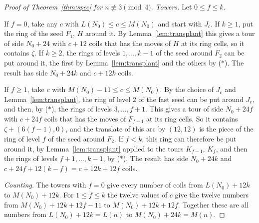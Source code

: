 \documentclass[11pt]{amsart}
\theoremstyle{remark}
\begin{document}
\begin{proof}[Proof of Theorem~\ref{thm:spec} for $n\not\equiv3\pmod 4$]
\emph{Towers.} Let $0\le f\le k$.

If $f=0$, take any $c$ with $L(N_0)\le c\le M(N_0)$ and start with $J_c$. If $k\ge1$, put the ring of the seed
$F_1$, $H$ around it. By Lemma~\ref{lem:transplant} this gives a tour of side $N_0+24$ with $c+12$ coils that has
the moves of $H$ at its ring cells, so it contains $\zeta$. If $k\ge2$, the rings of levels $1,\dots,k-1$ of the
seed around $F_2$ can be put around it, the first by Lemma~\ref{lem:transplant} and the others by ($*$). The result
has side $N_0+24k$ and $c+12k$ coils.

If $f\ge1$, take $c$ with $M(N_0)-11\le c\le M(N_0)$. By the choice of $J_c$ and Lemma~\ref{lem:transplant}, the ring
of level $2$ of the fast seed can be put around $J_c$, and then, by ($*$), the rings of levels $3,\dots,f+1$. This
gives a tour of side $N_0+24f$ with $c+24f$ coils that has the moves of $F_{f+1}$ at its ring cells. So it contains
$\zeta+(6(f-1),0)$, and the translate of this arc by $(12,12)$ is the piece of the ring of level $f$ of the seed
around $F_2$. If $f<k$, this ring can
therefore be put around it, by Lemma~\ref{lem:transplant} applied to the tours $K_{f-1}$, $K_f$, and then the rings
of levels $f+1,\dots,k-1$, by ($*$). The result has side $N_0+24k$ and $c+24f+12(k-f)=c+12k+12f$ coils.

\emph{Counting.} The towers with $f=0$ give every number of coils from $L(N_0)+12k$ to $M(N_0)+12k$. For
$1\le f\le k$ the twelve values of $c$ give the twelve numbers from $M(N_0)+12k+12f-11$ to $M(N_0)+12k+12f$. Together
these are all numbers from $L(N_0)+12k=L(n)$ to $M(N_0)+24k=M(n)$.
\end{proof}
\end{document}
